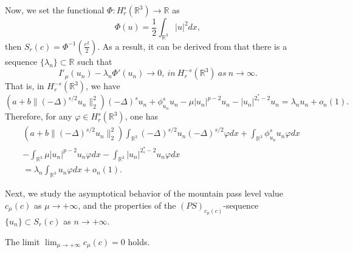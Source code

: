Now, we set the functional $\Phi:H^s_r(\mathbb{R}^3)\to \mathbb{R}$ as
$$
\Phi(u)=\frac{1}{2}\int_{\mathbb{R}^3} |u|^2dx,
$$
then $S_{r}(c)=\Phi^{-1}(\frac{c^2}{2})$. As a result, it can be derived from 
\cite[Proposition 5.12]{W6888} that there is a sequence 
$\{\lambda_n\}\subset \mathbb{R}$ such that
$$
I'_\mu(u_n)-\lambda_n \Phi'(u_n)\to 0,~in ~H^{-s}_r(\mathbb{R}^3) ~as~n\to \infty.
$$
That is, in $H^{-s}_r(\mathbb{R}^3)$, we have
\begin{equation}\label{5.16}
\left(a+b\|(-\Delta)^{s/2}u_n\|^2_2\right)(-\Delta)^s u_n+\phi^s_{u_n}u_n
-\mu |u_n|^{p-2}u_n-|u_n|^{2^*_s-2}u_n
=\lambda_n u_n+o_n(1).
\end{equation}
Therefore, for any $\varphi \in H^s_r(\mathbb{R}^3)$, one has
\begin{equation}\label{5.166}
\begin{split}
&\left(a+b\|(-\Delta)^{s/2}u_n\|^2_2\right)
\int_{\mathbb{R}^3}(-\Delta)^{s/2} u_n(-\Delta)^{s/2} \varphi dx
+\int_{\mathbb{R}^3}\phi^s_{u_n}u_n\varphi dx \\
&-\int_{\mathbb{R}^3}\mu |u_n|^{p-2}u_n\varphi dx
 -\int_{\mathbb{R}^3}|u_n|^{2^*_s-2}u_n\varphi dx \\
&=\lambda_n \int_{\mathbb{R}^3}u_n\varphi dx +o_n(1).
\end{split}
\end{equation}

Next, we study the asymptotical behavior of the mountain pass level value 
$c_\mu(c)$ as $\mu \to +\infty$, and the properties of  the $(PS)_{c_\mu(c)}$-sequence 
$\{u_n\}\subset S_{r}(c)$ as $n\to +\infty$.

\begin{lemma}\label{lem5.7} 
The limit $\lim_{\mu\to +\infty}c_\mu(c)=0 $ holds.
\end{lemma}

